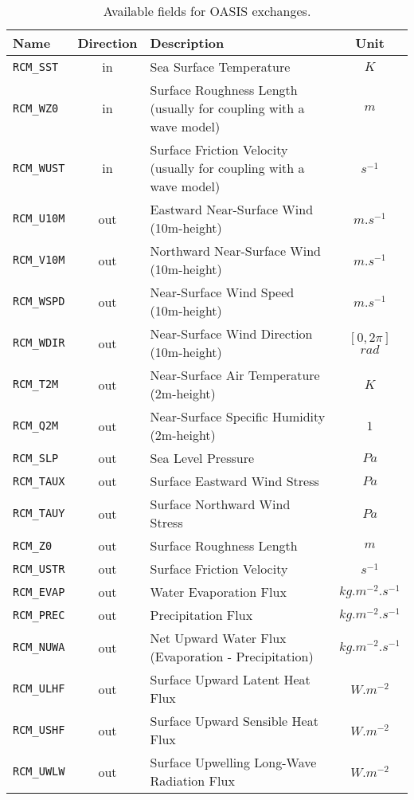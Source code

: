 \begin{table}[ht]
\caption{Available fields for OASIS exchanges.}
\vspace{0.05 in}
\centering
\begin{tabular}{l|c|l|c}
\hline
Name & Direction & Description & Unit\\
\hline
\verb=RCM_SST=  & in & Sea Surface Temperature & $K$\\
\verb=RCM_WZ0=  & in & Surface Roughness Length (usually for coupling with a wave model) & $m$\\
\verb=RCM_WUST= & in & Surface Friction Velocity (usually for coupling with a wave model) & $s^{-1}$\\
\hline
\verb=RCM_U10M= & out & Eastward Near-Surface Wind (10m-height) & $m.s^{-1}$\\
\verb=RCM_V10M= & out & Northward Near-Surface Wind (10m-height) & $m.s^{-1}$\\
\verb=RCM_WSPD= & out & Near-Surface Wind Speed (10m-height) & $m.s^{-1}$\\
\verb=RCM_WDIR= & out & Near-Surface Wind Direction (10m-height) & $[0,2\pi]$ $rad$\\
\verb=RCM_T2M=  & out & Near-Surface Air Temperature (2m-height) & $K$\\
\verb=RCM_Q2M=  & out & Near-Surface Specific Humidity (2m-height) & $1$\\
\verb=RCM_SLP=  & out & Sea Level Pressure & $Pa$\\
\verb=RCM_TAUX= & out & Surface Eastward Wind Stress & $Pa$\\
\verb=RCM_TAUY= & out & Surface Northward Wind Stress & $Pa$\\
\verb=RCM_Z0=   & out & Surface Roughness Length & $m$\\
\verb=RCM_USTR= & out & Surface Friction Velocity & $s^{-1}$\\
\verb=RCM_EVAP= & out & Water Evaporation Flux & $kg.m^{-2}.s^{-1}$\\
\verb=RCM_PREC= & out & Precipitation Flux & $kg.m^{-2}.s^{-1}$\\
\verb=RCM_NUWA= & out & Net Upward Water Flux (Evaporation - Precipitation) & $kg.m^{-2}.s^{-1}$\\
\verb=RCM_ULHF= & out & Surface Upward Latent Heat Flux & $W.m^{-2}$\\
\verb=RCM_USHF= & out & Surface Upward Sensible Heat Flux & $W.m^{-2}$\\
\verb=RCM_UWLW= & out & Surface Upwelling Long-Wave Radiation Flux & $W.m^{-2}$\\

\end{tabular}
\end{table}
